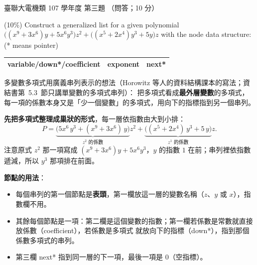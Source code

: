 \begin{pastexam}[label={px:ust-107-ee-ds-03}]{臺聯大電機類 107 學年度 第三題}
（問答；10 分）

(10\%) Construct a generalized list for a given polynomial $\big((x^9+3x^6)y+5x^6y^3\big)z^2+\big((x^5+2x^4)y^3+5y\big)z$ with the node data structure: (* means pointer)
\begin{center}
\begin{tabular}{|c|c|c|}
\hline
variable/down*/coefficient & exponent & next* \\ \hline
\end{tabular}
\end{center}
\end{pastexam}

\begin{pastsoln}
多變數多項式用廣義串列表示的想法（Horowitz 等人的資料結構課本的寫法；資結書第~5.3~節只講單變數的多項式串列）：
把多項式看成\textbf{最外層變數}的多項式，每一項的係數本身又是「少一個變數」的多項式，用向下的指標指到另一個串列。

\textbf{先把多項式整理成巢狀的形式}，每一層依指數由大到小排：
\[
P = \underbrace{\bigl(5x^6\, y^3 + (x^9 + 3x^6)\, y\bigr)}_{z^2 \text{ 的係數}} z^2
  + \underbrace{\bigl((x^5 + 2x^4)\, y^3 + 5\, y\bigr)}_{z^1 \text{ 的係數}} z .
\]
注意原式 $z^2$ 那一項寫成 $(x^9+3x^6)y + 5x^6y^3$，$y$ 的指數 $1$ 在前；串列裡依指數遞減，所以 $y^3$ 那項排在前面。

\textbf{節點的用法}：
\begin{itemize}
\item 每個串列的第一個節點是\textbf{表頭}，第一欄放這一層的變數名稱（$z$、$y$ 或 $x$），指數欄不用。
\item 其餘每個節點是一項：第二欄是這個變數的指數；第一欄若係數是常數就直接放係數（coefficient），若係數是多項式
就放向下的指標（down*），指到那個係數多項式的串列。
\item 第三欄 next* 指到同一層的下一項，最後一項是 $0$（空指標）。
\end{itemize}


\end{pastsoln}
